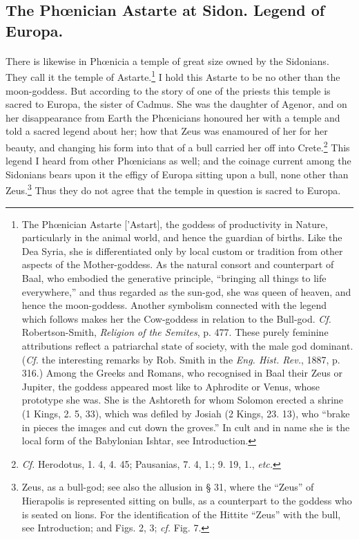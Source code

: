 \documentclass[a4paper, 11pt, oneside, polutonikogreek, english]{article}
\begin{document}
\subsection{The Phœnician Astarte at Sidon. Legend of Europa.}
\paragraph{}
There is likewise in Phœnicia a temple of great size owned by the Sidonians. They call it the temple of Astarte.\footnote{The Phœnician Astarte ['Astart], the goddess of productivity in Nature, particularly in the animal world, and hence the guardian of births. Like the Dea Syria, she is differentiated only by local custom or tradition from other aspects of the Mother-goddess. As the natural consort and counterpart of Baal, who embodied the generative principle, ``bringing all things to life everywhere,'' and thus regarded as the sun-god, she was queen of heaven, and hence the moon-goddess. Another symbolism connected with the legend which follows makes her the Cow-goddess in relation to the Bull-god. \emph{Cf.} Robertson-Smith, \emph{Religion of the Semites}, p. 477. These purely feminine attributions reflect a patriarchal state of society, with the male god dominant. (\emph{Cf.} the interesting remarks by Rob. Smith in the \emph{Eng. Hist. Rev.}, 1887, p. 316.) Among the Greeks and Romans, who recognised in Baal their Zeus or Jupiter, the goddess appeared most like to Aphrodite or Venus, whose prototype she was. She is the Ashtoreth for whom Solomon erected a shrine (1 Kings, 2. 5, 33), which was defiled by Josiah (2 Kings, 23. 13), who ``brake in pieces the images and cut down the groves.'' In cult and in name she is the local form of the Babylonian Ishtar, see Introduction.} I hold this Astarte to be no other than the moon-goddess. But according to the story of one of the priests this temple is sacred to Europa, the sister of Cadmus. She was the daughter of Agenor, and on her disappearance from Earth the Phœnicians honoured her with a temple and told a sacred legend about her; how that Zeus was enamoured of her for her beauty, and changing his form into that of a bull carried her off into Crete.\footnote{\emph{Cf.} Herodotus, 1. 4, 4. 45; Pausanias, 7. 4, 1.; 9. 19, 1., \emph{etc.}} This legend I heard from other Phœnicians as well; and the coinage current among the Sidonians bears upon it the effigy of Europa sitting upon a bull, none other than Zeus.\footnote{Zeus, as a bull-god; see also the allusion in § 31, where the ``Zeus'' of Hierapolis is represented sitting on bulls, as a counterpart to the goddess who is seated on lions. For the identification of the Hittite ``Zeus'' with the bull, see Introduction; and Figs. 2, 3; \emph{cf.} Fig. 7.} Thus they do not agree that the temple in question is sacred to Europa.
\end{document}
